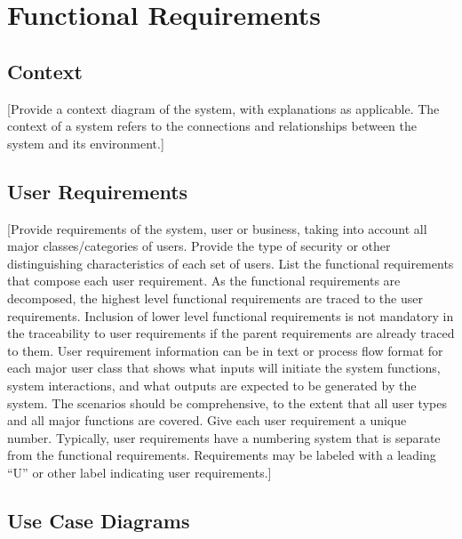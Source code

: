 \documentclass[a4paper,12pt]{article}
\begin{document}
\section{Functional Requirements}
\subsection{Context}
[Provide a context diagram of the system, with explanations as applicable.  The context of a system refers to the connections and relationships between the system and its environment.]

\subsection{User Requirements}
[Provide requirements of the system, user or business, taking into account all major classes/categories of users.  Provide the type of security or other distinguishing characteristics of each set of users.  List the functional requirements that compose each user requirement.  As the functional requirements are decomposed, the highest level functional requirements are traced to the user requirements.  Inclusion of lower level functional requirements is not mandatory in the traceability to user requirements if the parent requirements are already traced to them.
User requirement information can be in text or process flow format for each major user class that shows what inputs will initiate the system functions, system interactions, and what outputs are expected to be generated by the system.  The scenarios should be comprehensive, to the extent that all user types and all major functions are covered.  Give each user requirement a unique number.  Typically, user requirements have a numbering system that is separate from the functional requirements.  Requirements may be labeled with a leading “U” or other label indicating user requirements.]


\subsection{Use Case Diagrams}
\end{document}
